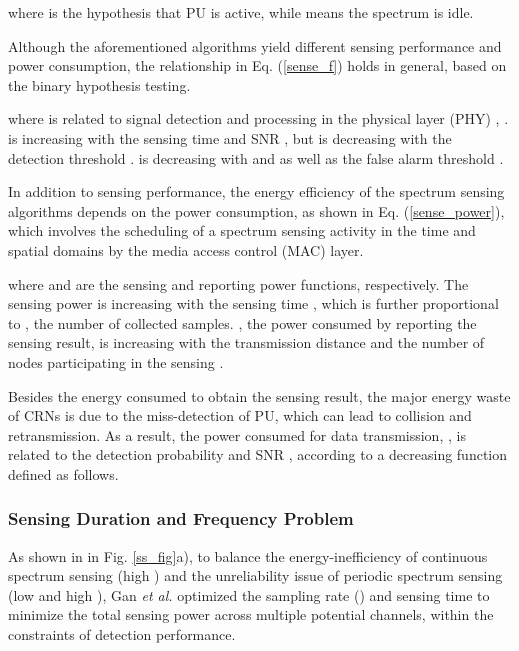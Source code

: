 \documentclass[journal,12pt,onecolumn]{IEEEtran}
\begin{document}
where  is the hypothesis that PU is active, while  means the spectrum is idle.

Although the aforementioned algorithms yield different sensing performance and power consumption, the relationship in Eq. (\ref{sense_f}) holds in general, based on the binary hypothesis testing.

where  is related to signal detection and processing in the physical layer (PHY) \cite{SSsingleDualRadio}, \cite{HO}.  is increasing with the sensing time  and SNR , but is decreasing with the detection threshold .  is decreasing with  and  as well as the false alarm threshold .

In addition to sensing performance, the energy efficiency of the spectrum sensing algorithms depends on the power consumption, as shown in Eq. (\ref{sense_power}), which involves the scheduling of a spectrum sensing activity in the time and spatial domains by the media access control (MAC) layer.

where  and  are the sensing and reporting power functions, respectively. The sensing power  is increasing with the sensing time , which is further proportional to , the number of collected samples. , the power consumed by reporting the sensing result, is increasing with the transmission distance  and the number of nodes participating in the sensing . 

Besides the energy consumed to obtain the sensing result, the major energy waste of CRNs is due to the miss-detection of PU, which can lead to collision and retransmission. As a result, the power consumed for data transmission, , is related to the detection probability  and SNR , according to a decreasing function  defined as follows.


\subsubsection{Sensing Duration and Frequency Problem} As shown in in Fig. \ref{ss_fig}a), to balance the energy-inefficiency of continuous spectrum sensing (high ) and the unreliability issue of periodic spectrum sensing (low  and high ), Gan \emph{et al.} \cite{6253067} optimized the sampling rate () and sensing time  to minimize the total sensing power across multiple potential channels, within the constraints of detection performance. 
\end{document}
